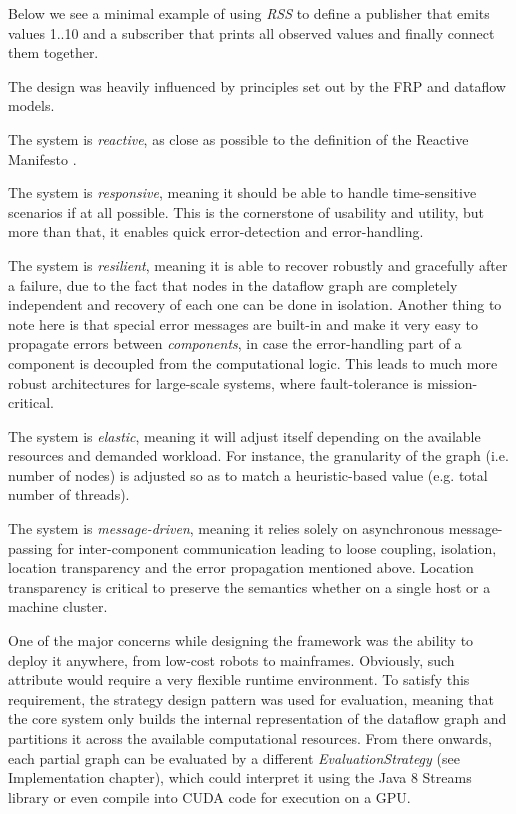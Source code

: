 \documentclass{dithesis}
\begin{document}
Below we see a minimal example of using \textit{RSS} to define a publisher that emits values 1..10 and a subscriber that prints all observed values and finally connect them together.



The design was heavily influenced by principles set out by the FRP and dataflow models. 


The system is \textit{reactive}, as close as possible to the definition of the Reactive Manifesto \cite{manifesto}. 

The system is \textit{responsive}, meaning it should be able to handle time-sensitive scenarios if at all possible. This is the cornerstone of usability and utility, but more than that, it enables quick error-detection and error-handling.

The system is \textit{resilient}, meaning it is able to recover robustly and gracefully after a failure, due to the fact that nodes in the dataflow graph are completely independent and recovery of each one can be done in isolation. Another thing to note here is that special error messages are built-in and make it very easy to propagate errors between \textit{components}, in case the error-handling part of a component is decoupled from the computational logic. This leads to much more robust architectures for large-scale systems, where fault-tolerance is mission-critical.

The system is \textit{elastic}, meaning it will adjust itself depending on the available resources and demanded workload. For instance, the granularity of the graph (i.e. number of nodes) is adjusted so as to match a heuristic-based value (e.g. total number of threads).

The system is \textit{message-driven}, meaning it relies solely on asynchronous message-passing for inter-component communication leading to loose coupling, isolation, location transparency and the error propagation mentioned above. Location transparency is critical to preserve the semantics whether on a single host or a machine cluster. 



One of the major concerns while designing the framework was the ability to deploy it anywhere, from low-cost robots to mainframes. Obviously, such attribute would require a very flexible runtime environment. To satisfy this requirement, the strategy design pattern was used for evaluation, meaning that the core system only builds the internal representation of the dataflow graph and partitions it across the available computational resources. From there onwards, each partial graph can be evaluated by a different \textit{EvaluationStrategy} (see Implementation chapter), which could interpret it using the Java 8 Streams library\cite{java_streams} or even compile into CUDA code for execution on a GPU.
\end{document}
